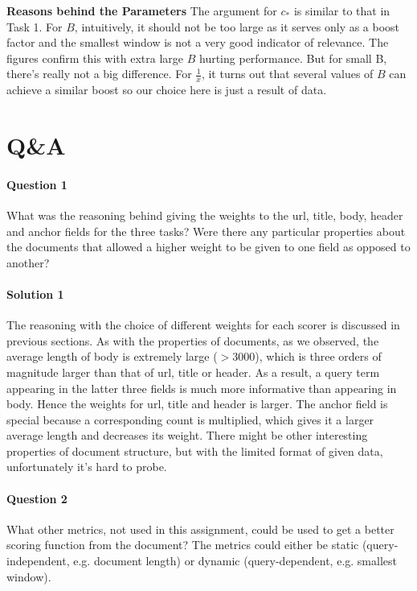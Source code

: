 \documentclass{article}
\begin{document}
\textbf{Reasons behind the Parameters} The argument for $c_*$ is similar to that in Task 1. For $B$, intuitively, it should not be too large as it serves only as a boost factor and the smallest window is not a very good indicator of relevance. The figures confirm this with extra large $B$ hurting performance. But for small B, there's really not a big difference. For $\frac{1}{x}$, it turns out that several values of $B$ can achieve a similar boost so our choice here is just a result of data.

\section{Q\&A}

\paragraph{Question 1}
What was the reasoning behind giving the weights to the url, title, body, header and anchor fields for the three tasks? Were there any particular properties about the documents that allowed a higher weight to be given to one field as opposed to another?

\vspace{-3mm}
\paragraph{Solution 1}
The reasoning with the choice of different weights for each scorer is discussed in previous sections. As with the properties of documents, as we observed, the average length of body is extremely large ($> 3000$), which is three orders of magnitude larger than that of url, title or header. As a result, a query term appearing in the latter three fields is much more informative than appearing in body. Hence the weights for url, title and header is larger. The anchor field is special because a corresponding count is multiplied, which gives it a larger average length and decreases its weight. There might be other interesting properties of document structure, but with the limited format of given data, unfortunately it's hard to probe.

\paragraph{Question 2}
What other metrics, not used in this assignment, could be used to get a better scoring function from the document? The metrics could either be static (query-independent, e.g. document length) or dynamic (query-dependent, e.g. smallest window).
\end{document}

